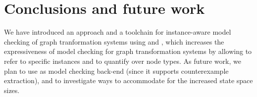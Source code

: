 
\section{Conclusions and future work}
\label{sec:conclusions}

We have introduced an approach and a toolchain for instance-aware model checking of graph tranformation systems using \henshin and \mcrl, which increases the expressiveness of model checking for graph transformation systems by allowing to refer to specific instances and to quantify over node types. As future work, we plan to use \cadp as model checking back-end (since it supports counterexample extraction), and to investigate ways to accommodate for the increased state space sizes.


